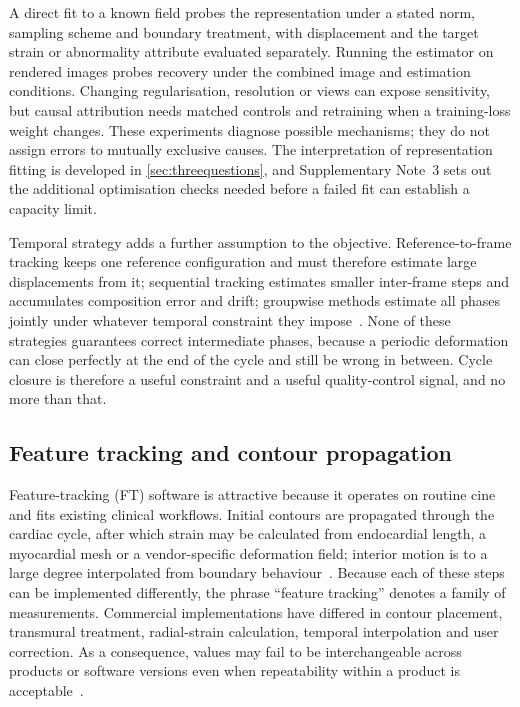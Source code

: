 A direct fit to a known field probes the representation under a stated norm, sampling scheme and boundary treatment, with displacement and the target strain or abnormality attribute evaluated separately. Running the estimator on rendered images probes recovery under the combined image and estimation conditions. Changing regularisation, resolution or views can expose sensitivity, but causal attribution needs matched controls and retraining when a training-loss weight changes. These experiments diagnose possible mechanisms; they do not assign errors to mutually exclusive causes. The interpretation of representation fitting is developed in \cref{sec:threequestions}, and Supplementary Note~3 sets out the additional optimisation checks needed before a failed fit can establish a capacity limit.

Temporal strategy adds a further assumption to the objective. Reference-to-frame tracking keeps one reference configuration and must therefore estimate large displacements from it; sequential tracking estimates smaller inter-frame steps and accumulates composition error and drift; groupwise methods estimate all phases jointly under whatever temporal constraint they impose~\cite{metz2011,chen2024}. None of these strategies guarantees correct intermediate phases, because a periodic deformation can close perfectly at the end of the cycle and still be wrong in between. Cycle closure is therefore a useful constraint and a useful quality-control signal, and no more than that.

\subsection{Feature tracking and contour propagation}\label{sec:ft}

Feature-tracking (FT) software is attractive because it operates on routine cine and fits existing clinical workflows. Initial contours are propagated through the cardiac cycle, after which strain may be calculated from endocardial length, a myocardial mesh or a vendor-specific deformation field; interior motion is to a large degree interpolated from boundary behaviour~\cite{pedrizzetti2016}. Because each of these steps can be implemented differently, the phrase ``feature tracking'' denotes a family of measurements. Commercial implementations have differed in contour placement, transmural treatment, radial-strain calculation, temporal interpolation and user correction. As a consequence, values may fail to be interchangeable across products or software versions even when repeatability within a product is acceptable~\cite{lim2021,militaru2021}.

